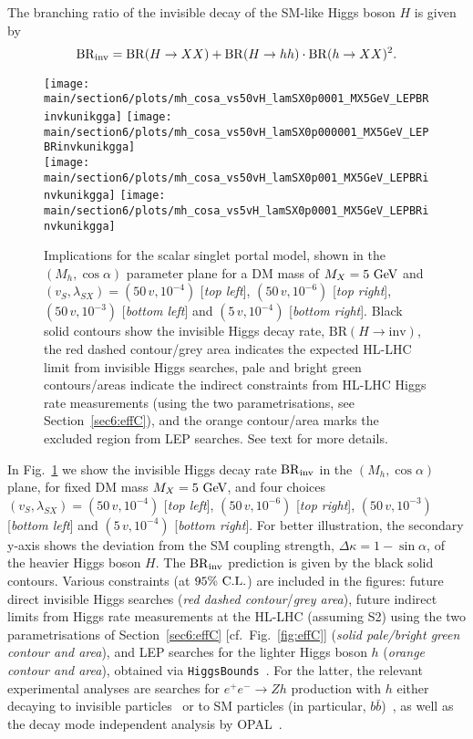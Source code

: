 \documentclass[../report.tex]{subfiles}
\providecommand{\main}{..}
\begin{document}
The branching ratio of the invisible decay of the SM-like Higgs boson $H$ is given by
\begin{align}
\BRHinv = \mathrm{BR}(H\to XX) + \mathrm{BR}(H\to hh) \cdot \mathrm{BR}(h\to XX)^2.
\end{align}
 
\begin{figure}[t]
\centering
\texttt{[image: \\main/section6/plots/mh\_cosa\_vs50vH\_lamSX0p0001\_MX5GeV\_LEPBRinvkunikgga]}\hfill
\texttt{[image: \\main/section6/plots/mh\_cosa\_vs50vH\_lamSX0p000001\_MX5GeV\_LEPBRinvkunikgga]}\\
\texttt{[image: \\main/section6/plots/mh\_cosa\_vs50vH\_lamSX0p001\_MX5GeV\_LEPBRinvkunikgga]}\hfill
\texttt{[image: \\main/section6/plots/mh\_cosa\_vs5vH\_lamSX0p0001\_MX5GeV\_LEPBRinvkunikgga]}
\caption{Implications for the scalar singlet portal model, shown in the $(M_h, \cos\alpha)$ parameter plane for a DM mass of $M_X = 5~\text{GeV}$ and $(v_S, \lambda_{SX}) = (50\,v, 10^{-4})$ [\emph{top left}], $(50\,v, 10^{-6})$ [\emph{top right}], $(50\,v, 10^{-3})$ [\emph{bottom left}] and $(5\,v, 10^{-4})$ [\emph{bottom right}]. Black solid contours show the invisible Higgs decay rate, $\mathrm{BR}(H\to \mathrm{inv})$, the red dashed contour/grey area indicates the expected HL-LHC limit from invisible Higgs searches, pale and bright green contours/areas indicate the indirect constraints from HL-LHC Higgs rate measurements (using the two parametrisations, see Section~\ref{sec6:effC}), and the orange contour/area marks the excluded region from LEP searches. See text for more details.}
\label{Fig:singletportal}
\end{figure}
 
 In Fig.~\ref{Fig:singletportal} we show the invisible Higgs decay rate $\mathrm{BR}_\mathrm{inv}$ in the $(M_h, \cos\alpha)$ plane, for fixed DM mass $M_X = 5~\text{GeV}$, and four choices $(v_S, \lambda_{SX}) = (50\,v, 10^{-4})$ [\emph{top left}], $(50\,v, 10^{-6})$ [\emph{top right}], $(50\,v, 10^{-3})$ [\emph{bottom left}] and $(5\,v, 10^{-4})$ [\emph{bottom right}]. For better illustration, the secondary y-axis shows the deviation from the SM coupling strength, $\Delta \kappa = 1 -\sin\alpha$, of the heavier Higgs boson $H$. The $\mathrm{BR}_\mathrm{inv}$ prediction is given by the black solid contours. Various constraints (at $95\%~\mathrm{C.L.}$) are included in the figures: future direct invisible Higgs searches (\emph{red dashed contour}/\emph{grey area}), future indirect limits from Higgs rate measurements {at the HL-LHC (assuming S2)} using the two parametrisations of Section~\ref{sec6:effC} [cf.~Fig.~\ref{fig:effC}] (\emph{solid pale/bright green contour and area}), and LEP searches for the lighter Higgs boson $h$ (\emph{orange contour and area}), obtained via \texttt{HiggsBounds}~\cite{Bechtle:2008jh,Bechtle:2011sb,Bechtle:2013wla}. For the latter, the relevant experimental analyses are searches for $e^+e^-\to Zh$ production with $h$ either decaying to invisible particles~\cite{Searches:2001ab,Abdallah:2003ry,Achard:2004cf,Abbiendi:2007ac} or to SM particles (in particular, $b\bar{b}$)~\cite{Schael:2006cr}, as well as the decay mode independent analysis by OPAL~\cite{Abbiendi:2002qp}.
\end{document}
